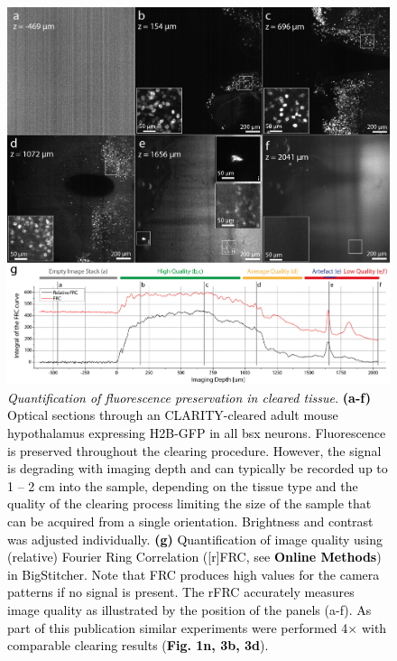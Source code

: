 \documentclass[]{spie}  %
\def\red{\textcolor{black}}
\begin{document}
\begin{figure}[ht!]
\includegraphics[width=\textwidth]{fig-rf.jpg}
\vspace{-4.0mm}
\caption{\hspace{-0.5mm}\red{\emph{Quantification of fluorescence preservation in cleared tissue.} \textbf{(a-f)} Optical sections through an CLARITY-cleared adult mouse hypothalamus expressing H2B-GFP in all bsx neurons. Fluorescence is preserved throughout the clearing procedure. However, the signal is degrading with imaging depth and can typically be recorded up to 1 -- 2 cm into the sample, depending on the tissue type and the quality of the clearing process limiting the size of the sample that can be acquired from a single orientation. Brightness and contrast was adjusted individually. \textbf{(g)} Quantification of image quality using (relative) Fourier Ring Correlation ([r]FRC, see \textbf{Online Methods}) in BigStitcher. Note that FRC produces high values for the camera patterns if no signal is present. The rFRC accurately measures image quality as illustrated by the position of the panels (a-f). As part of this publication similar experiments were performed 4$\times$ with comparable clearing results (\textbf{Fig. 1n, 3b, 3d}).} 
}
\label{fig:sup-fig-rf}
\end{figure}

\pagebreak
\end{document}
